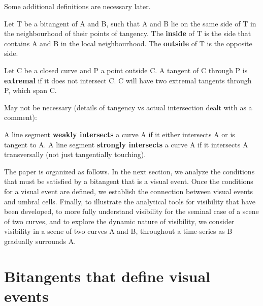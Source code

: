\documentclass[12pt]{article}
\begin{document}

Some additional definitions are necessary later.

\begin{defn2}
Let T be a bitangent of A and B, such that A and B lie on the same side of T
in the neighbourhood of their points of tangency.
The {\bf inside} of T is the side that contains A and B in the local neighbourhood.
The {\bf outside} of T is the opposite side.
\end{defn2}

\begin{defn2}
Let C be a closed curve and P a point outside C.
A tangent of C through P is {\bf extremal} if it does not intersect C.
C will have two extremal tangents through P, which span C.
\end{defn2}

May not be necessary (details of tangency vs actual intersection dealt with as a comment):
\begin{defn2}
A line segment {\bf weakly intersects} a curve A if it either intersects A 
or is tangent to A.
A line segment {\bf strongly intersects} a curve A if it intersects A transversally
(not just tangentially touching).
\end{defn2}

The paper is organized as follows.
In the next section, we analyze the conditions that must be satisfied by a bitangent 
that is a visual event.
Once the conditions for a visual event are defined, 
we establish the connection between visual events and umbral cells.
Finally, to illustrate the analytical tools for visibility that have been developed, 
to more fully understand visibility for the seminal case of a scene of two curves, 
and to explore the dynamic nature of visibility,
we consider visibility in a scene of two curves A and B,
throughout a time-series as B gradually surrounds A.

\clearpage


\section{Bitangents that define visual events} 
\label{sec:ve}
\end{document}
